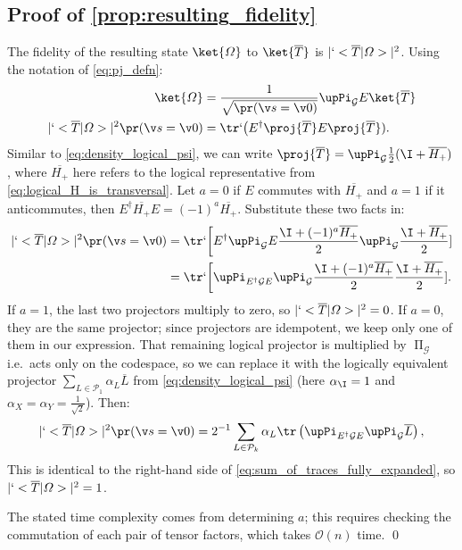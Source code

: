 \subsection{Proof of \texorpdfstring
{\cref{prop:resulting_fidelity}}
{Proposition~\ref{prop:resulting_fidelity}}}
The fidelity of the resulting state $\ket{\Omega}$
to $\ket{\overline{T}}$ is $|`<\overline{T}|\Omega>|^2$.
Using the notation of \cref{eq:pj_defn}:
\begin{align}
	\ket{\Omega}
	&=\frac1{\sqrt{\pr(\v s =\v 0)}}
	\upPi_{\mathcal G}
	E\ket{\overline{T}} \notag \\
	|`<\overline{T}|\Omega>|^2 \pr(\v s =\v 0)
	&=\tr`\big(E^\dag \proj{\overline{T}}E \proj{\overline{T}}).
\end{align}
Similar to \cref{eq:density_logical_psi},
we can write $\proj{\overline{T}} =\upPi_{\mathcal G} \frac12(\I +\overline{H_+})$,
where $\overline{H_+}$ here refers to
the logical representative from \cref{eq:logical_H_is_transversal}.
Let $a=0$ if $E$ commutes with $\overline{H_+}$
and $a=1$ if it anticommutes,
then $E^\dag \overline{H_+}E =(-1)^a \overline{H_+}$.
Substitute these two facts in:
\begin{align}
|`<\overline{T}|\Omega>|^2 \pr(\v s =\v 0)
&=\tr`\bigg[E^\dag \upPi_{\mathcal G} E \frac{\I +(-1)^a \overline{H_+}}2 \upPi_{\mathcal G} \frac{\I +\overline{H_+}}2]
\notag \\
&=
\tr`\bigg[\upPi_{E^\dagger \mathcal G E}\upPi_{\mathcal G}
\frac{\I +(-1)^a \overline{H_+}}2
\frac{\I +\overline{H_+}}2].
\end{align}
If $a =1$,
the last two projectors multiply to zero,
so $|`<\overline{T}|\Omega>|^2 =0$.
If $a =0$,
they are the same projector;
since projectors are idempotent,
we keep only one of them in our expression.
That remaining logical projector is multiplied by $\upPi_{\mathcal G}$
i.e.\ acts only on the codespace,
so we can replace it with
the logically equivalent projector
$\sum_{L \in \mathcal P_1} \alpha_L \overline{L}$
from \cref{eq:density_logical_psi}
(here $\alpha_\I =1$ and $\alpha_X =\alpha_Y =\frac1{\sqrt{2}}$).
Then:
\begin{equation}
|`<\overline{T}|\Omega>|^2 \pr(\v s =\v 0)
=2^{-1}\sum_{L\in\mathcal P_k}\alpha_L \tr\left(
\upPi_{E^\dagger \mathcal G E}\upPi_{\mathcal G} \overline L
\right),
\label{eq:sum_of_traces_T_fully_expanded}
\end{equation}
This is identical to the right-hand side of
\cref{eq:sum_of_traces_fully_expanded},
so $|`<\overline{T}|\Omega>|^2 =1$.

The stated time complexity comes from determining $a$;
this requires checking the commutation of each pair of tensor factors,
which takes $\mathcal O(n)$ time. \qed